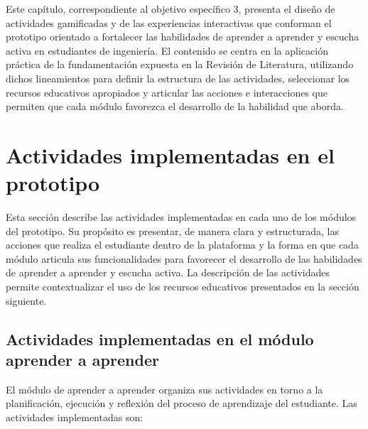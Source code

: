 Este capítulo, correspondiente al objetivo específico 3, presenta el diseño de actividades gamificadas y de las experiencias interactivas que conforman el prototipo orientado a fortalecer las habilidades de aprender a aprender y escucha activa en estudiantes de ingeniería. El contenido se centra en la aplicación práctica de la fundamentación expuesta en la Revisión de Literatura, utilizando dichos lineamientos para definir la estructura de las actividades, seleccionar los recursos educativos apropiados y articular las acciones e interacciones que permiten que cada módulo favorezca el desarrollo de la habilidad que aborda.

\section{Actividades implementadas en el prototipo}

Esta sección describe las actividades implementadas en cada uno de los módulos del prototipo. Su propósito es presentar, de manera clara y estructurada, las acciones que realiza el estudiante dentro de la plataforma y la forma en que cada módulo articula sus funcionalidades para favorecer el desarrollo de las habilidades de aprender a aprender y escucha activa. La descripción de las actividades permite contextualizar el uso de los recursos educativos presentados en la sección siguiente.

\subsection{Actividades implementadas en el módulo aprender a aprender}

El módulo de aprender a aprender organiza sus actividades en torno a la planificación, ejecución y reflexión del proceso de aprendizaje del estudiante. Las actividades implementadas son:

